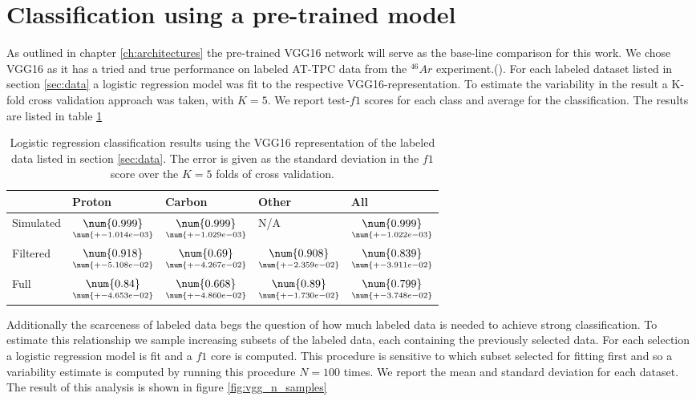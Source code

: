 \section{Classification using a pre-trained model}

As outlined in chapter \ref{ch:architectures} the pre-trained VGG16 network will serve as the base-line comparison for this work. We chose VGG16 as it has a tried and true performance on labeled AT-TPC data from the $^{46}Ar$ experiment.(\cite{Kuchera2019}). For each labeled dataset listed in section \ref{sec:data} a logistic regression model was fit to the respective VGG16-representation. To estimate the variability in the result a K-fold cross validation approach was taken, with $K=5$. We report test-$f1$ scores for each class and average for the classification. The results are listed in table \ref{tab:vgg_results}

\begin{table}
\centering
\caption[VGG classification results]{Logistic regression classification results using the VGG16 representation of the labeled data listed in section \ref{sec:data}. The error is given as the standard deviation in the $f1$ score over the $K=5$ folds of cross validation.}\label{tab:vgg_results}
\begin{tabular}{lllll}
\toprule
{} & Proton & Carbon & Other & All \\
\midrule
Simulated &  $\underset{\num{+- 1.014e-03 }  }{\num{ 0.999 } }$ &  $\underset{\num{+- 1.029e-03 }  }{\num{ 0.999 } }$ &  N/A &  $\underset{\num{+- 1.022e-03 }  }{\num{ 0.999 } }$ \\
Filtered  &  $\underset{\num{+- 5.108e-02 }  }{\num{ 0.918 } }$ &  $\underset{\num{+- 4.267e-02 }  }{\num{ 0.69 } }$ &  $\underset{\num{+- 2.359e-02 }  }{\num{ 0.908 } }$ &  $\underset{\num{+- 3.911e-02 }  }{\num{ 0.839 } }$ \\
Full      &  $\underset{\num{+- 4.653e-02 }  }{\num{ 0.84 } }$ &  $\underset{\num{+- 4.860e-02 }  }{\num{ 0.668 } }$ &  $\underset{\num{+- 1.730e-02 }  }{\num{ 0.89 } }$ &  $\underset{\num{+- 3.748e-02 }  }{\num{ 0.799 } }$ \\
\bottomrule
\end{tabular}
\end{table}

 Additionally the scarceness of labeled data begs the question of how much labeled data is needed to achieve strong classification. To estimate this relationship we sample increasing subsets of the labeled data, each containing the previously selected data. For each selection a logistic regression model is fit and a $f1$ core is computed. This procedure is sensitive to which subset selected for fitting first and so a variability estimate is computed by running this procedure $N=100$ times. We report the mean and standard deviation for each dataset. The result of this analysis is shown in figure \ref{fig:vgg_n_samples}

